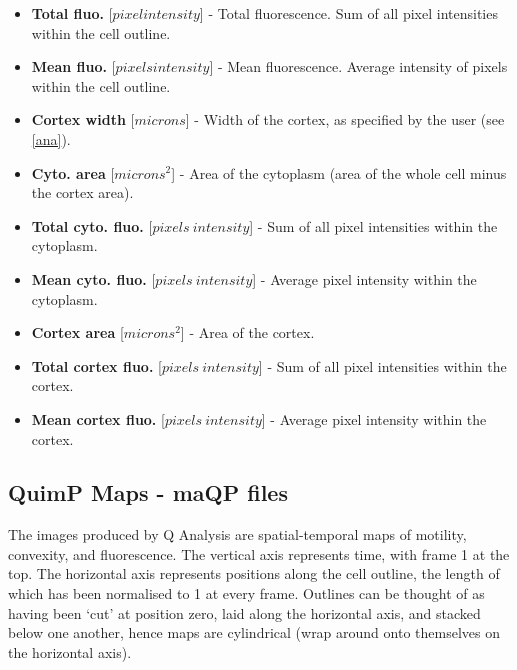 \documentclass[a4paper,12pt]{article}
\begin{document}
\begin{itemize}

	\item \textbf{Total fluo.} [$pixel intensity$] - Total fluorescence. Sum of all pixel intensities within the cell outline. 

	\item \textbf{Mean fluo.} [$pixels intensity$] -  Mean fluorescence. Average intensity of pixels within the cell outline.

	\item \textbf{Cortex width} [$microns$] - Width of the cortex, as specified by the user (see \autoref{ana}).
	
	\item \textbf{Cyto. area} [$microns^{2}$] - Area of the cytoplasm (area of the whole cell minus the cortex area).
	
	\item \textbf{Total cyto. fluo.} [$pixels~intensity$] - Sum of all pixel intensities within the cytoplasm. 
	
	\item \textbf{Mean cyto. fluo.} [$pixels~intensity$] - Average pixel intensity within the cytoplasm.
	
	\item \textbf{Cortex area} [$microns^{2}$] - Area of the cortex.
	
	\item \textbf{Total cortex fluo.} [$pixels~intensity$] - Sum of all pixel intensities within the cortex. 
	
	\item \textbf{Mean cortex fluo.} [$pixels~intensity$] - Average pixel intensity within the cortex.
	
\end{itemize}


\subsection{QuimP Maps - maQP files}
\label{maps}

The images produced by Q Analysis are spatial-temporal maps of motility, convexity, and fluorescence.  The vertical axis represents 
time, with frame 1 at the top.  The horizontal axis represents positions along the cell outline, the length of which
has been normalised to 1 at every frame.  Outlines can be
thought of as having been `cut' at position zero, laid along the horizontal axis, and stacked below one another, hence maps
are cylindrical (wrap around onto themselves on the horizontal axis). 
\end{document}
